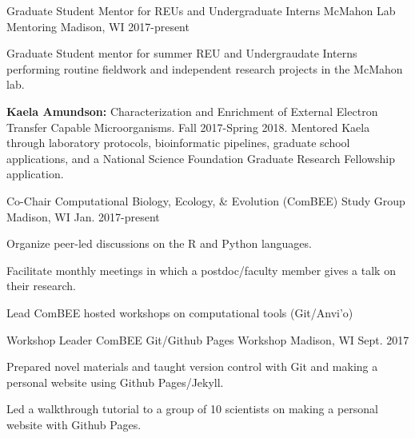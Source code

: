 

\begin{cventries}

  \cventry
    {Graduate Student Mentor for REUs and Undergraduate Interns} %
    {McMahon Lab Mentoring} %
    {Madison, WI} %
    {2017-present} %
    {
      \begin{cvitems} %
        \item {Graduate Student mentor for summer REU and Undergraudate Interns performing routine fieldwork and independent research projects in the McMahon lab.}
        \item {\textbf{Kaela Amundson:} Characterization and Enrichment of External Electron Transfer Capable Microorganisms. Fall 2017-Spring 2018. Mentored Kaela through laboratory protocols, bioinformatic pipelines, graduate school applications, and a National Science Foundation Graduate Research Fellowship application.}
      \end{cvitems}
    }

    \cventry
    {Co-Chair} %
    {Computational Biology, Ecology, \& Evolution (ComBEE) Study Group} %
    {Madison, WI} %
    {Jan. 2017-present} %
    {
      \begin{cvitems} %
        \item {Organize peer-led discussions on the R and Python languages.}
        \item {Facilitate monthly meetings in which a postdoc/faculty member gives a talk on their research.}
        \item {Lead ComBEE hosted workshops on computational tools (Git/Anvi'o)}
      \end{cvitems}
    }
    
  \cventry
    {Workshop Leader} %
    {ComBEE Git/Github Pages Workshop} %
    {Madison, WI} %
    {Sept. 2017} %
    {
      \begin{cvitems} %
        \item {Prepared novel materials and taught version control with Git and making a personal website using Github Pages/Jekyll.}
        \item {Led a walkthrough tutorial to a group of 10 scientists on making a personal website with Github Pages.}
      \end{cvitems}
    }


\end{cventries}
